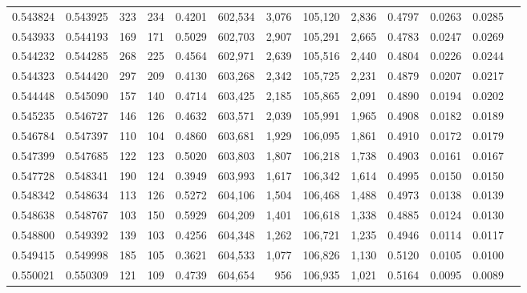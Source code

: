 \begin{tabular}{rrrrrrrrrrrrr}
0.543824 & 0.543925 &   323 &   234 &                                     0.4201 & 602,534 &   3,076 & 105,120 &   2,836 & 0.4797 & 0.0263 & 0.0285 \\
0.543933 & 0.544193 &   169 &   171 &                                     0.5029 & 602,703 &   2,907 & 105,291 &   2,665 & 0.4783 & 0.0247 & 0.0269 \\
0.544232 & 0.544285 &   268 &   225 &                                     0.4564 & 602,971 &   2,639 & 105,516 &   2,440 & 0.4804 & 0.0226 & 0.0244 \\
0.544323 & 0.544420 &   297 &   209 &                                     0.4130 & 603,268 &   2,342 & 105,725 &   2,231 & 0.4879 & 0.0207 & 0.0217 \\
0.544448 & 0.545090 &   157 &   140 &                                     0.4714 & 603,425 &   2,185 & 105,865 &   2,091 & 0.4890 & 0.0194 & 0.0202 \\
0.545235 & 0.546727 &   146 &   126 &                                     0.4632 & 603,571 &   2,039 & 105,991 &   1,965 & 0.4908 & 0.0182 & 0.0189 \\
0.546784 & 0.547397 &   110 &   104 &                                     0.4860 & 603,681 &   1,929 & 106,095 &   1,861 & 0.4910 & 0.0172 & 0.0179 \\
0.547399 & 0.547685 &   122 &   123 &                                     0.5020 & 603,803 &   1,807 & 106,218 &   1,738 & 0.4903 & 0.0161 & 0.0167 \\
0.547728 & 0.548341 &   190 &   124 &                                     0.3949 & 603,993 &   1,617 & 106,342 &   1,614 & 0.4995 & 0.0150 & 0.0150 \\
0.548342 & 0.548634 &   113 &   126 &                                     0.5272 & 604,106 &   1,504 & 106,468 &   1,488 & 0.4973 & 0.0138 & 0.0139 \\
0.548638 & 0.548767 &   103 &   150 &                                     0.5929 & 604,209 &   1,401 & 106,618 &   1,338 & 0.4885 & 0.0124 & 0.0130 \\
0.548800 & 0.549392 &   139 &   103 &                                     0.4256 & 604,348 &   1,262 & 106,721 &   1,235 & 0.4946 & 0.0114 & 0.0117 \\
0.549415 & 0.549998 &   185 &   105 &                                     0.3621 & 604,533 &   1,077 & 106,826 &   1,130 & 0.5120 & 0.0105 & 0.0100 \\
0.550021 & 0.550309 &   121 &   109 &                                     0.4739 & 604,654 &     956 & 106,935 &   1,021 & 0.5164 & 0.0095 & 0.0089 \\

\end{tabular}
